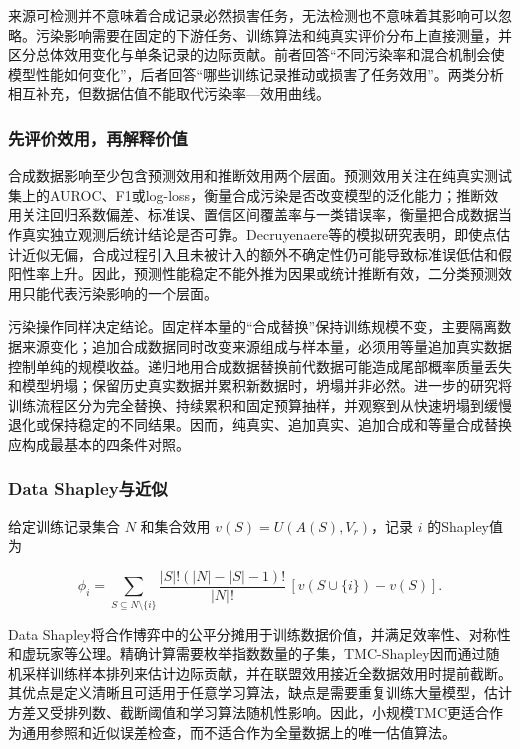 \documentclass[
  chinese,
  12pt,
  a4paper,
  chinese,
  UTF8]{ctexart}
\begin{document}
来源可检测并不意味着合成记录必然损害任务，无法检测也不意味着其影响可以忽略。污染影响需要在固定的下游任务、训练算法和纯真实评价分布上直接测量，并区分总体效用变化与单条记录的边际贡献。前者回答``不同污染率和混合机制会使模型性能如何变化''，后者回答``哪些训练记录推动或损害了任务效用''。两类分析相互补充，但数据估值不能取代污染率---效用曲线。

\subsubsection{先评价效用，再解释价值}\label{ux5148ux8bc4ux4ef7ux6548ux7528ux518dux89e3ux91caux4ef7ux503c}

合成数据影响至少包含预测效用和推断效用两个层面。预测效用关注在纯真实测试集上的AUROC、F1或log-loss，衡量合成污染是否改变模型的泛化能力；推断效用关注回归系数偏差、标准误、置信区间覆盖率与一类错误率，衡量把合成数据当作真实独立观测后统计结论是否可靠。Decruyenaere等的模拟研究表明，即使点估计近似无偏，合成过程引入且未被计入的额外不确定性仍可能导致标准误低估和假阳性率上升\autocite{decruyenaere2024utility}。因此，预测性能稳定不能外推为因果或统计推断有效，二分类预测效用只能代表污染影响的一个层面。

污染操作同样决定结论。固定样本量的``合成替换''保持训练规模不变，主要隔离数据来源变化；追加合成数据同时改变来源组成与样本量，必须用等量追加真实数据控制单纯的规模收益。递归地用合成数据替换前代数据可能造成尾部概率质量丢失和模型坍塌\autocite{shumailov2024collapse}；保留历史真实数据并累积新数据时，坍塌并非必然\autocite{gerstgrasser2024collapse}。进一步的研究将训练流程区分为完全替换、持续累积和固定预算抽样，并观察到从快速坍塌到缓慢退化或保持稳定的不同结果\autocite{kazdan2025thrive}。因而，纯真实、追加真实、追加合成和等量合成替换应构成最基本的四条件对照。

\subsubsection{Data Shapley与近似}\label{data-shapleyux4e0eux8fd1ux4f3c}

给定训练记录集合 \(N\) 和集合效用 \(v(S)=U(A(S),V_r)\)，记录 \(i\)
的Shapley值为

\[\phi_i=\sum_{S\subseteq N\setminus\{i\}}
\frac{|S|!(|N|-|S|-1)!}{|N|!}\,[v(S\cup\{i\})-v(S)].\]

Data
Shapley将合作博弈中的公平分摊用于训练数据价值，并满足效率性、对称性和虚玩家等公理\autocite{ghorbani2019datashapley}。精确计算需要枚举指数数量的子集，TMC-Shapley因而通过随机采样训练样本排列来估计边际贡献，并在联盟效用接近全数据效用时提前截断。其优点是定义清晰且可适用于任意学习算法，缺点是需要重复训练大量模型，估计方差又受排列数、截断阈值和学习算法随机性影响。因此，小规模TMC更适合作为通用参照和近似误差检查，而不适合作为全量数据上的唯一估值算法。
\end{document}
